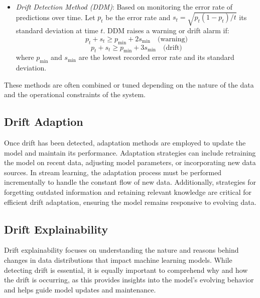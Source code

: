 \begin{itemize}
    \item \textit{Drift Detection Method (DDM)}: Based on monitoring the error rate of
          predictions over time. Let $ p_t $ be the error rate and $ s_t = \sqrt{p_t(1 - p_t)/t} $
          its standard deviation at time $ t $. DDM raises a warning or drift alarm if:
          \begin{equation}
              p_t + s_t \geq p_{\min} + 2s_{\min} \quad \text{(warning)}
          \end{equation}
          \begin{equation}
              p_t + s_t \geq p_{\min} + 3s_{\min} \quad \text{(drift)}
          \end{equation}
          where $ p_{\min} $ and $ s_{\min} $ are the lowest recorded error rate and
          its standard deviation.
\end{itemize}

These methods are often combined or tuned depending on the nature of the data
and the operational constraints of the system.

\subsection*{Drift Adaption}\label{subsec:drift_adaption}
Once drift has been detected, adaptation methods are employed to update the
model and maintain its performance. Adaptation strategies can include
retraining the model on recent data, adjusting model parameters, or
incorporating new data sources. In stream learning, the adaptation process must
be performed incrementally to handle the constant flow of new data.
Additionally, strategies for forgetting outdated information and retaining
relevant knowledge are critical for efficient drift adaptation, ensuring the
model remains responsive to evolving data.

\subsection*{Drift Explainability}\label{subsec:drift_explainability}
Drift explainability focuses on understanding the nature and reasons behind
changes in data distributions that impact machine learning models. While
detecting drift is essential, it is equally important to comprehend why and how
the drift is occurring, as this provides insights into the model's evolving
behavior and helps guide model updates and maintenance.

